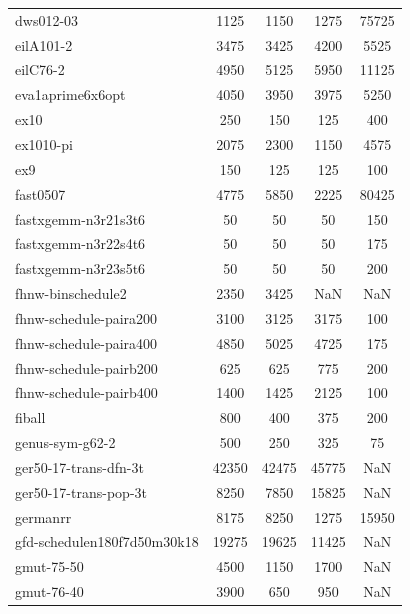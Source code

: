\begin{longtable}{lcccc}
dws012-03                   &     1125 &     1150 &     1275 & 75725 \\
eilA101-2                   &     3475 &     3425 &     4200 &  5525 \\
eilC76-2                    &     4950 &     5125 &     5950 & 11125 \\
eva1aprime6x6opt            &     4050 &     3950 &     3975 &  5250 \\
ex10                        &      250 &      150 &      125 &   400 \\
ex1010-pi                   &     2075 &     2300 &     1150 &  4575 \\
ex9                         &      150 &      125 &      125 &   100 \\
fast0507                    &     4775 &     5850 &     2225 & 80425 \\
fastxgemm-n3r21s3t6         &       50 &       50 &       50 &   150 \\
fastxgemm-n3r22s4t6         &       50 &       50 &       50 &   175 \\
fastxgemm-n3r23s5t6         &       50 &       50 &       50 &   200 \\
fhnw-binschedule2           &     2350 &     3425 &      NaN &   NaN \\
fhnw-schedule-paira200      &     3100 &     3125 &     3175 &   100 \\
fhnw-schedule-paira400      &     4850 &     5025 &     4725 &   175 \\
fhnw-schedule-pairb200      &      625 &      625 &      775 &   200 \\
fhnw-schedule-pairb400      &     1400 &     1425 &     2125 &   100 \\
fiball                      &      800 &      400 &      375 &   200 \\
genus-sym-g62-2             &      500 &      250 &      325 &    75 \\
ger50-17-trans-dfn-3t       &    42350 &    42475 &    45775 &   NaN \\
ger50-17-trans-pop-3t       &     8250 &     7850 &    15825 &   NaN \\
germanrr                    &     8175 &     8250 &     1275 & 15950 \\
gfd-schedulen180f7d50m30k18 &    19275 &    19625 &    11425 &   NaN \\
gmut-75-50                  &     4500 &     1150 &     1700 &   NaN \\
gmut-76-40                  &     3900 &      650 &      950 &   NaN \\

\end{longtable}
